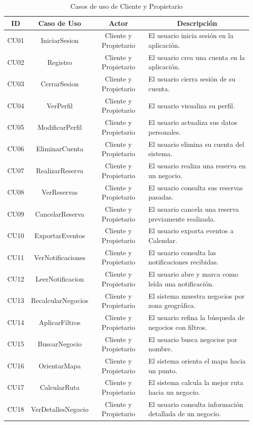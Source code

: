 \begin{table}[h]
\centering
\begin{tabular}{|c|c|c|p{7cm}|}
\hline
\textbf{ID}\cellcolor[RGB]{217,217,217} &
\textbf{Caso de Uso}\cellcolor[RGB]{217,217,217} &
\textbf{Actor}\cellcolor[RGB]{217,217,217} &
\multicolumn{1}{|c|}{\textbf{Descripción}\cellcolor[RGB]{217,217,217}} \\
\hline

CU01 & IniciarSesion & Cliente y Propietario & El usuario inicia sesión en la aplicación. \\
\hline
CU02 & Registro & Cliente y Propietario & El usuario crea una cuenta en la aplicación. \\
\hline
CU03 & CerrarSesion & Cliente y Propietario & El usuario cierra sesión de su cuenta. \\
\hline
CU04 & VerPerfil & Cliente y Propietario & El usuario visualiza su perfil. \\
\hline
CU05 & ModificarPerfil & Cliente y Propietario & El usuario actualiza sus datos personales. \\
\hline
CU06 & EliminarCuenta & Cliente y Propietario & El usuario elimina su cuenta del sistema. \\
\hline
CU07 & RealizarReserva & Cliente y Propietario & El usuario realiza una reserva en un negocio. \\
\hline
CU08 & VerReservas & Cliente y Propietario & El usuario consulta sus reservas pasadas. \\
\hline
CU09 & CancelarReserva & Cliente y Propietario & El usuario cancela una reserva previamente realizada. \\
\hline
CU10 & ExportarEventos & Cliente y Propietario & El usuario exporta eventos a Calendar. \\
\hline
CU11 & VerNotificaciones & Cliente y Propietario & El usuario consulta las notificaciones recibidas. \\
\hline
CU12 & LeerNotificacion & Cliente y Propietario & El usuario abre y marca como leída una notificación. \\
\hline
CU13 & RecalcularNegocios & Cliente y Propietario & El sistema muestra negocios por zona geográfica. \\
\hline
CU14 & AplicarFiltros & Cliente y Propietario & El usuario refina la búsqueda de negocios con filtros. \\
\hline
CU15 & BuscarNegocio & Cliente y Propietario & El usuario busca negocios por nombre. \\
\hline
CU16 & OrientarMapa & Cliente y Propietario & El sistema orienta el mapa hacia un punto. \\
\hline
CU17 & CalcularRuta & Cliente y Propietario & El sistema calcula la mejor ruta hacia un negocio. \\
\hline
CU18 & VerDetallesNegocio & Cliente y Propietario & El usuario consulta información detallada de un negocio. \\
\hline

\end{tabular}
\caption{Casos de uso de Cliente y Propietario}
\label{tab:cliente_propietario}
\end{table}

